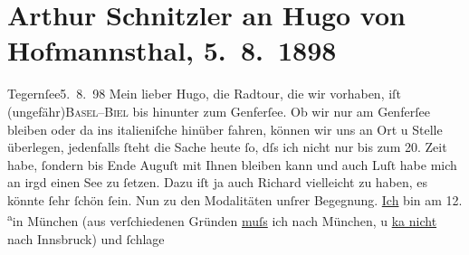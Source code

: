 

               \section[Arthur Schnitzler an Hugo von Hofmannsthal, 5. 8. 1898]{ Arthur Schnitzler an Hugo von Hofmannsthal, 5. 8. 1898}\nopagebreak{}\rehead{ }\begin{ledgroupsized}[t]{13cm}\normalsize\beginnumbering{} \toendnotes[C]{\smallbreak\pagebreak[2]} 
\toendnotes[C]{\smallbreak}\pstart
           \raggedleft{}{\pb}Tegernſee5. 8. 98\pend
           \pstart
           Mein lieber Hugo, die Radtour, die wir vorhaben, iſt \introOben{}(\introOben{}ungefähr\introOben{})\introOben{}{ }\textsc{Basel}–\textsc{Biel} bis hinunter zum Genferſee. Ob wir nur am
                        Genferſee bleiben oder da{\geminationn} ins italieniſche hinüber fahren, können wir uns an Ort u Stelle überlegen,
                    jedenfalls ſteht die Sache heute ſo, dſs ich nicht nur bis zum 20.
                    Zeit habe, ſondern bis Ende Auguſt mit Ihnen bleiben kann und auch
                    Luſt habe {\pb}mich an irgd einen See zu ſetzen. Dazu iſt
                    ja auch Richard vielleicht zu haben, es
                    könnte ſehr ſchön ſein.\pend
           \pstart
           Nun zu den Modalitäten unſrer Begegnung. \uline{Ich} bin
                    am 12.{ }\substVorne{}\textsuperscript{a}\substDazwischen{}i\substHinten{}n München (aus verſchiedenen Gründen
                        \uline{muſs} ich nach München, u \uline{ka{\geminationn}
                        nicht} nach Innsbruck) und ſchlage

\end{ledgroupsized}
